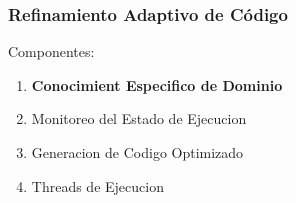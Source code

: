 \documentclass{beamer}\usetheme{Madrid} %
\begin{document}
\begin{frame}
\frametitle{Refinamiento Adaptivo de Código}
Componentes:
\begin{enumerate}
\item \textbf{Conocimient Especifico de Dominio}
\item Monitoreo del Estado de Ejecucion
\item Generacion de Codigo Optimizado
\item Threads de Ejecucion
\end{enumerate}
\end{frame}
\end{document}
